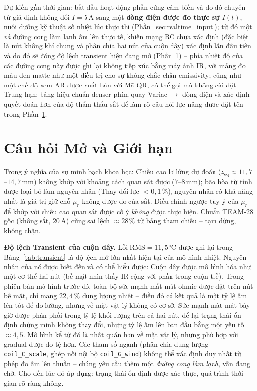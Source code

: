 \documentclass[a4paper, 10pt, conference]{ieeeconf}
\theoremstyle{remark}
\begin{document}
Dự kiến gần thời gian: bắt đầu hoạt động phần cứng cảm biến và do đó chuyển từ
giả định không đổi $I=5\,\mathrm A$ sang một \textbf{dòng điện được đo thực sự $I(t)$},
nuôi dưỡng kỹ thuật số nhiệt lúc thực thi (Phần~\ref{sec:realtime_input}); từ đó
một \emph{và} đường cong làm lạnh ấm lên thực tế, khiến mạng RC chưa xác định
(đặc biệt là nút không khí chung và phân chia hai nút của cuộn dây) xác định lần
đầu tiên và do đó sẽ đóng độ lệch transient hiện đang mở (Phần~\ref{sec:limitations}) --
phía nhiệt độ của các đường cong này được ghi lại không tiếp xúc bằng máy ảnh IR,
với mảng đo màu đen matte như một điều trị cho sự không chắc chắn emissivity; cũng
như một chế độ xem AR được xuất bản với Mã QR, có thể gọi mà không cài đặt. Trung hạn:
bảng hiệu chuẩn denser phím quay Variac $\to$ dòng điện và xác định quyết đoán hơn của
độ thẩm thấu sắt để làm rõ câu hỏi lực nâng được đặt tên trong Phần~\ref{sec:limitations}.


\section{Câu hỏi Mở và Giới hạn}
\label{sec:limitations}

Trong ý nghĩa của sự minh bạch khoa học: Chiều cao lơ lửng dự đoán ($z_{\mathrm{eq}}\approx11{,}7$--$14{,}7\,\mathrm{mm}$)
không khớp với khoảng cách quan sát được ($7$--$8\,\mathrm{mm}$); bão hòa từ tính
được loại bỏ làm nguyên nhân (Thay đổi lực $<0{,}1\,\%$), nguyên nhân có khả năng
nhất là giá trị giữ chỗ $\mu_r$ không được đo của sắt. Điều chỉnh ngược tùy ý của
$\mu_r$ để khớp với chiều cao quan sát được cố ý \emph{không} được thực hiện. Chuẩn
TEAM-28 gốc (không sắt, $20\,\mathrm A$) cũng sai lệch $\approx28\,\%$ từ bảng tham
chiếu -- tạm dừng, không chặn.

\textbf{Độ lệch Transient của cuộn dây.} Lỗi $\mathrm{RMS}=11{,}5\,^\circ$C được
ghi lại trong Bảng~\ref{tab:transient} là độ lệch mở lớn nhất hiện tại của mô hình
nhiệt. Nguyên nhân của nó được biết đến và có thể hiểu được: Cuộn dây được mô hình
hóa như một cơ thể hai nút (bề mặt nhìn thấy IR cộng với phần trong cuộn trễ).
Trong phiên bản mô hình trước đó, toàn bộ sức mạnh mất mát ohmic được đặt trên nút
bề mặt, chỉ mang $22{,}4\,\%$ dung lượng nhiệt -- điều đó có kết quả là một tỷ lệ
ấm lên tốt để đo lường, nhưng về mặt vật lý không có cơ sở. Sức mạnh mất mát bây
giờ được phân phối trong tỷ lệ khối lượng trên cả hai nút, để lại trạng thái ổn định
chứng minh không thay đổi, nhưng tỷ lệ ấm lên ban đầu bằng một yếu tố $\approx4{,}5$.
Mô hình kể từ đó là nhất quán hơn về mặt vật lý, nhưng phù hợp với gradual được đo
tệ hơn. Các tham số ngành (phân chia dung lượng \texttt{coil\_C\_scale}, ghép nối
nội bộ \texttt{coil\_G\_wind}) không thể xác định duy nhất từ phép đo ấm lên thuần
-- chúng yêu cầu thêm một \emph{đường cong làm lạnh}, vẫn đang chờ. Cho đến lúc đó
áp dụng: trạng thái ổn định được xác thực, quá trình thời gian rõ ràng không.
\end{document}
